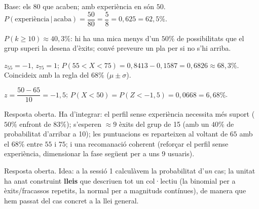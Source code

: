 \begin{solucions}
\begin{sollist}
  \item Base: els $80$ que acaben; amb experiència en són $50$.
        $P(\text{experiència}\,|\,\text{acaba})=\dfrac{50}{80}=\dfrac{5}{8}=0,625=62,5\%$.
  \item $P(k\ge 10)\approx 40,3\%$: hi ha una mica menys d'un $50\%$ de possibilitats que
        el grup superi la desena d'èxits; convé preveure un pla per si no s'hi arriba.
  \item $z_{55}=-1$, $z_{75}=1$; $P(55<X<75)=0,8413-0,1587=0,6826\approx 68,3\%$.
        Coincideix amb la regla del $68\%$ ($\mu\pm\sigma$).
  \item $z=\dfrac{50-65}{10}=-1,5$; $P(X<50)=P(Z<-1,5)=0,0668=6,68\%$.
  \item Resposta oberta. Ha d'integrar: el perfil sense experiència necessita més suport
        ($50\%$ enfront de $83\%$); s'esperen $\approx 9$ èxits del grup de 15 (amb un
        $40\%$ de probabilitat d'arribar a 10); les puntuacions es reparteixen al voltant
        de $65$ amb el $68\%$ entre $55$ i $75$; i una recomanació coherent (reforçar el
        perfil sense experiència, dimensionar la fase següent per a uns 9 usuaris).
  \item Resposta oberta. Idea: a la sessió 1 calculàvem la probabilitat d'\emph{un} cas;
        la unitat ha anat construint \textbf{lleis} que descriuen tot un col·lectiu (la
        binomial per a èxits/fracassos repetits, la normal per a magnituds contínues), de
        manera que hem passat del cas concret a la llei general.
\end{sollist}
\end{solucions}
